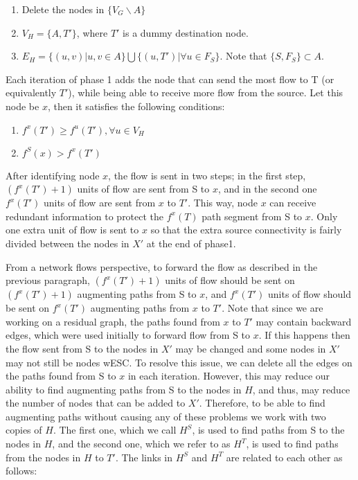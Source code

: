\documentclass[conference]{IEEEtran}
\begin{document}
\begin{enumerate}
\item Delete the nodes in $\{V_G \backslash A\}$
\item $V_H = \{A, T'\}$, where $T'$ is a dummy destination node.
\item $E_H = \{(u,v)|u,v \in A\} \bigcup \{(u,T')| \forall u \in F_S\}$. Note that $\{S, F_S\} \subset A$.
\end{enumerate}

Each iteration of phase 1 adds the node that can send the most flow to T (or equivalently $T'$), while being able to receive more flow from the source. Let this node be $x$, then it satisfies the following conditions:

\begin{enumerate}
\item $f^x(T') \geq f^u(T'), \forall u \in V_H$
\item $f^S(x) > f^x(T')$
\end{enumerate}

After identifying node $x$, the flow is sent in two steps; in the first step, $(f^x(T') + 1)$ units of flow are sent from S to $x$, and in the second one $f^x(T')$ units of flow are sent from $x$ to $T'$. This way, node $x$ can receive redundant information to protect the $f^x(T)$ path segment from S to $x$. Only one extra unit of flow is sent to $x$ so that the extra source connectivity is fairly divided between the nodes in $X'$ at the end of phase1. 

From a network flows perspective, to forward the flow as described in the previous paragraph, $(f^x(T') + 1)$ units of flow should be sent on $(f^x(T') + 1)$ augmenting paths from S to $x$, and $f^x(T')$ units of flow should be sent on $f^x(T')$ augmenting paths from $x$ to $T'$. Note that since we are working on a residual graph, the paths found from $x$ to $T'$ may contain backward edges, which were used initially to forward flow from S to $x$. If this happens then the flow sent from S to the nodes in $X'$ may be changed and some nodes in $X'$ may not still be nodes wESC. To resolve this issue, we can delete all the edges on the paths found from S to $x$ in each iteration. However, this may reduce our ability to find augmenting paths from S to the nodes in $H$, and thus, may reduce the number of nodes that can be added to $X'$. Therefore, to be able to find augmenting paths without causing any of these problems we work with two copies of $H$. The first one, which we call $H^S$, is used to find paths from S to the nodes in $H$, and the second one, which we refer to as $H^T$, is used to find paths from the nodes in $H$ to $T'$. The links in $H^S$ and $H^T$ are related to each other as follows:
\end{document}
